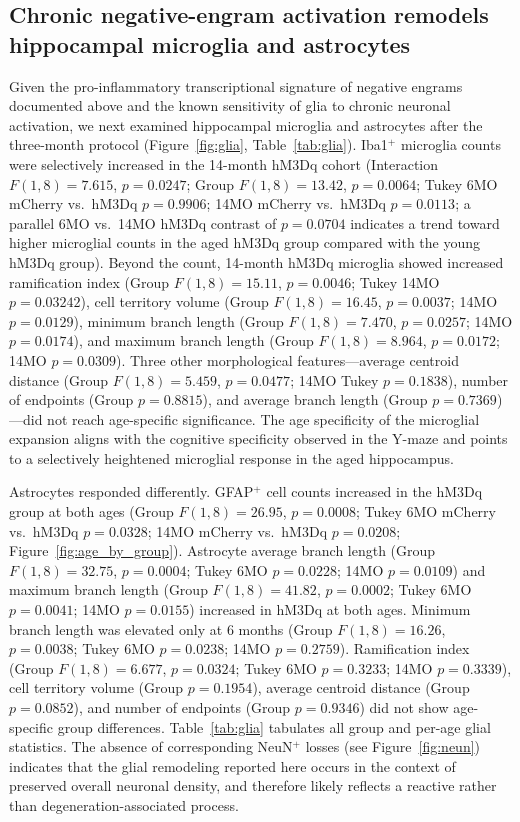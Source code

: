\documentclass[11pt]{article}
\begin{document}
\subsection{Chronic negative-engram activation remodels hippocampal microglia and astrocytes}

Given the pro-inflammatory transcriptional signature of negative engrams documented above and the known sensitivity of glia to chronic neuronal activation, we next examined hippocampal microglia and astrocytes after the three-month protocol (Figure~\ref{fig:glia}, Table~\ref{tab:glia}). Iba1$^{+}$ microglia counts were selectively increased in the 14-month hM3Dq cohort (Interaction $F(1,8)=7.615$, $p=0.0247$; Group $F(1,8)=13.42$, $p=0.0064$; Tukey 6MO mCherry vs.~hM3Dq $p=0.9906$; 14MO mCherry vs.~hM3Dq $p=0.0113$; a parallel 6MO vs.~14MO hM3Dq contrast of $p=0.0704$ indicates a trend toward higher microglial counts in the aged hM3Dq group compared with the young hM3Dq group). Beyond the count, 14-month hM3Dq microglia showed increased ramification index (Group $F(1,8)=15.11$, $p=0.0046$; Tukey 14MO $p=0.03242$), cell territory volume (Group $F(1,8)=16.45$, $p=0.0037$; 14MO $p=0.0129$), minimum branch length (Group $F(1,8)=7.470$, $p=0.0257$; 14MO $p=0.0174$), and maximum branch length (Group $F(1,8)=8.964$, $p=0.0172$; 14MO $p=0.0309$). Three other morphological features---average centroid distance (Group $F(1,8)=5.459$, $p=0.0477$; 14MO Tukey $p=0.1838$), number of endpoints (Group $p=0.8815$), and average branch length (Group $p=0.7369$)---did not reach age-specific significance. The age specificity of the microglial expansion aligns with the cognitive specificity observed in the Y-maze and points to a selectively heightened microglial response in the aged hippocampus.

Astrocytes responded differently. GFAP$^{+}$ cell counts increased in the hM3Dq group at both ages (Group $F(1,8)=26.95$, $p=0.0008$; Tukey 6MO mCherry vs.~hM3Dq $p=0.0328$; 14MO mCherry vs.~hM3Dq $p=0.0208$; Figure~\ref{fig:age_by_group}). Astrocyte average branch length (Group $F(1,8)=32.75$, $p=0.0004$; Tukey 6MO $p=0.0228$; 14MO $p=0.0109$) and maximum branch length (Group $F(1,8)=41.82$, $p=0.0002$; Tukey 6MO $p=0.0041$; 14MO $p=0.0155$) increased in hM3Dq at both ages. Minimum branch length was elevated only at 6 months (Group $F(1,8)=16.26$, $p=0.0038$; Tukey 6MO $p=0.0238$; 14MO $p=0.2759$). Ramification index (Group $F(1,8)=6.677$, $p=0.0324$; Tukey 6MO $p=0.3233$; 14MO $p=0.3339$), cell territory volume (Group $p=0.1954$), average centroid distance (Group $p=0.0852$), and number of endpoints (Group $p=0.9346$) did not show age-specific group differences. Table~\ref{tab:glia} tabulates all group and per-age glial statistics. The absence of corresponding NeuN$^{+}$ losses (see Figure~\ref{fig:neun}) indicates that the glial remodeling reported here occurs in the context of preserved overall neuronal density, and therefore likely reflects a reactive rather than degeneration-associated process.
\end{document}
